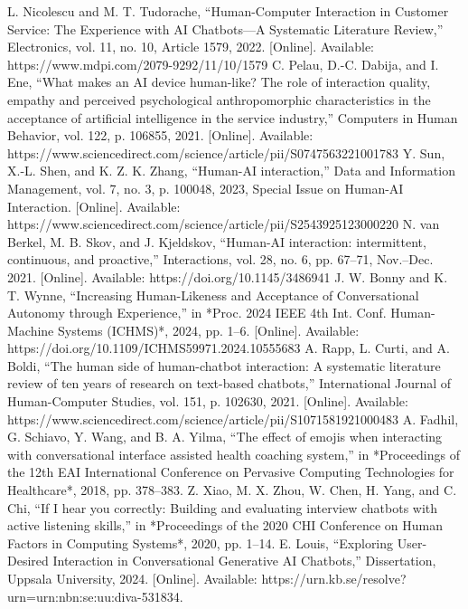 \documentclass[conference]{IEEEtran}
\begin{document}
\begin{thebibliography}{00}
	 L. Nicolescu and M. T. Tudorache, ``Human-Computer Interaction in Customer Service: The Experience with AI Chatbots—A Systematic Literature Review,'' Electronics, vol. 11, no. 10, Article 1579, 2022. [Online]. Available: https://www.mdpi.com/2079-9292/11/10/1579
	 C. Pelau, D.-C. Dabija, and I. Ene, ``What makes an AI device human-like? The role of interaction quality, empathy and perceived psychological anthropomorphic characteristics in the acceptance of artificial intelligence in the service industry,'' Computers in Human Behavior, vol. 122, p. 106855, 2021. [Online]. Available: https://www.sciencedirect.com/science/article/pii/S0747563221001783
	 Y. Sun, X.-L. Shen, and K. Z. K. Zhang, ``Human-AI interaction,'' Data and Information Management, vol. 7, no. 3, p. 100048, 2023, Special Issue on Human-AI Interaction. [Online]. Available: https://www.sciencedirect.com/science/article/pii/S2543925123000220
	 N. van Berkel, M. B. Skov, and J. Kjeldskov, ``Human-AI interaction: intermittent, continuous, and proactive,'' Interactions, vol. 28, no. 6, pp. 67–71, Nov.–Dec. 2021. [Online]. Available: https://doi.org/10.1145/3486941
	 J. W. Bonny and K. T. Wynne, ``Increasing Human-Likeness and Acceptance of Conversational Autonomy through Experience,'' in *Proc. 2024 IEEE 4th Int. Conf. Human-Machine Systems (ICHMS)*, 2024, pp. 1–6. [Online]. Available: https://doi.org/10.1109/ICHMS59971.2024.10555683
	 A. Rapp, L. Curti, and A. Boldi, ``The human side of human-chatbot interaction: A systematic literature review of ten years of research on text-based chatbots,'' International Journal of Human-Computer Studies, vol. 151, p. 102630, 2021. [Online]. Available: https://www.sciencedirect.com/science/article/pii/S1071581921000483
     A. Fadhil, G. Schiavo, Y. Wang, and B. A. Yilma, ``The effect of emojis when interacting with conversational interface assisted health coaching system,'' in *Proceedings of the 12th EAI International Conference on Pervasive Computing Technologies for Healthcare*, 2018, pp. 378--383.
     Z. Xiao, M. X. Zhou, W. Chen, H. Yang, and C. Chi, ``If I hear you correctly: Building and evaluating interview chatbots with active listening skills,'' in *Proceedings of the 2020 CHI Conference on Human Factors in Computing Systems*, 2020, pp. 1--14.
	 E. Louis, ``Exploring User-Desired Interaction in Conversational Generative AI Chatbots,'' Dissertation, Uppsala University, 2024. [Online]. Available: https://urn.kb.se/resolve?urn=urn:nbn:se:uu:diva-531834.

\end{thebibliography}
\end{document}
